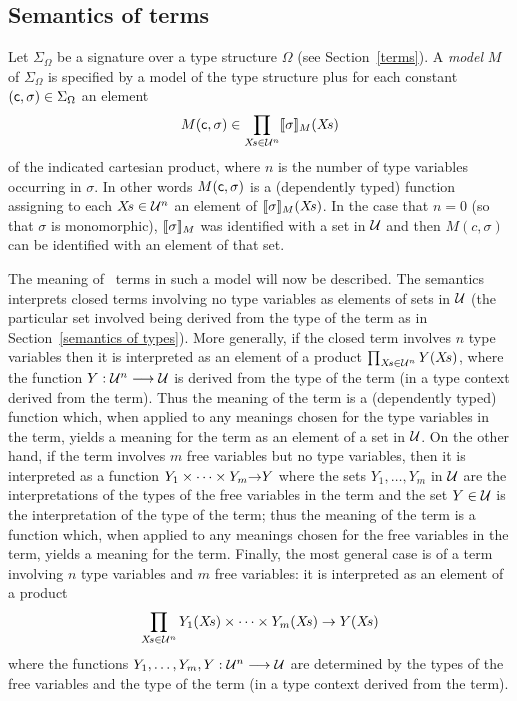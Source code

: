 \subsection{Semantics of terms}
\label{semantics of terms}

Let $\Sigma_{\Omega}$ be a signature over a type
structure $\Omega$ (see Section~\ref{terms}). A {\em model\/} $M$ of
$\Sigma_{\Omega}$ is specified by a model of the type structure plus
for each constant $(\mbox{\normalsize\sf c},\sigma)\in\Sigma_{\Omega}$ an
element
\[
M(\mbox{\normalsize\sf c},\sigma) \in
\prod_{X\!s\in{\cal U}^{n}}[\![\sigma]\!]_{M}(X\!s)
\]
of the indicated cartesian product, where $n$ is the number of type
variables occurring in $\sigma$. In other words
$M(\mbox{\normalsize\sf c},\sigma)$ is a (dependently typed) function
assigning to each $X\!s\in{\cal U}^{n}$ an element of
$[\![\sigma]\!]_{M}(X\!s)$. In the case that $n=0$ (so that
$\sigma$ is monomorphic), $[\![\sigma]\!]_{M}$ was identified
with a set in $\cal U$ and then $M(c,\sigma)$ can be
identified with an element of that set.

The meaning of \HOL\ terms in such a model will now be described. The
semantics interprets closed terms involving no type variables as
elements of sets in $\cal U$ (the particular set involved being derived
from the type of the term as in Section~\ref{semantics of types}). More
generally, if the closed term involves $n$ type variables then it is
interpreted as an element of a product $\prod_{X\!s\in{\cal
U}^{n}}Y(X\!s)$, where the function $Y:{\cal U}^{n}\longrightarrow{\cal
U}$ is derived from the type of the term (in a type context derived
from the term). Thus the meaning of the term is a (dependently typed)
function which, when applied to any meanings chosen for the type
variables in the term, yields a meaning for the term as an element of a
set in $\cal U$. On the other hand, if the term involves $m$ free
variables but no type variables, then it is interpreted as a function
$Y_1\times\cdots\times Y_m{\to} Y$ where the sets $Y_1,\ldots,Y_m$ in
$\cal U$ are the interpretations of the types of the free variables in
the term and the set $Y\in{\cal U}$ is the interpretation of the type
of the term; thus the meaning of the term is a function which, when
applied to any meanings chosen for the free variables in the term,
yields a meaning for the term. Finally, the most general case is of a
term involving $n$ type variables and $m$ free variables: it is
interpreted as an element of a product
\[
\prod_{X\!s\in{\cal
U}^{n}}Y_{1}(X\!s)\times\cdots\times Y_{m}(X\!s) \;{\to}\; Y(X\!s)
\]
where the functions $Y_{1},\ldots,Y_{m},Y:{\cal
U}^{n}\longrightarrow{\cal U}$ are determined by the types of the free
variables and the type of the term (in a type context derived from the
term).

